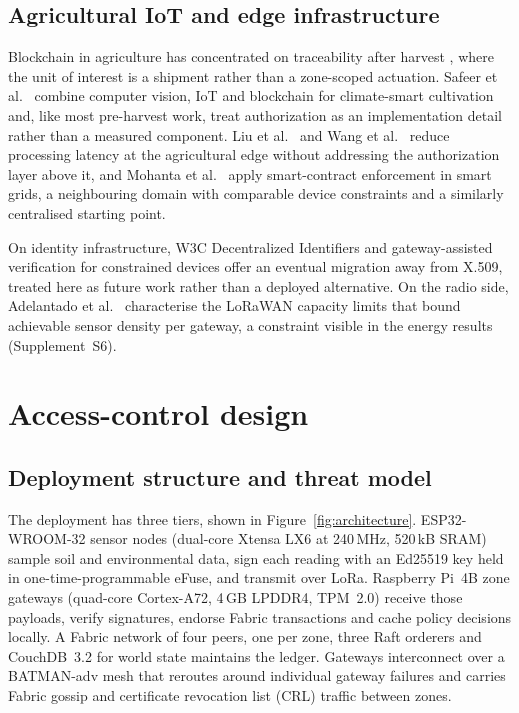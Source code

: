 \documentclass[a4paper,fleqn]{cas-sc}
\begin{document}
\subsection{Agricultural IoT and edge infrastructure}
\label{subsec:rw_agri}

Blockchain in agriculture has concentrated on traceability after harvest
\cite{tian2017traceability,lin2018blockchain,bandara2021modeling}, where the
unit of interest is a shipment rather than a zone-scoped actuation. Safeer et
al.\ \cite{safeer2025agrifarming} combine computer vision, IoT and blockchain
for climate-smart cultivation and, like most pre-harvest work, treat
authorization as an implementation detail rather than a measured component.
Liu et al.\ \cite{liu2019edge} and Wang et al.\ \cite{wang2021edge} reduce
processing latency at the agricultural edge without addressing the
authorization layer above it, and Mohanta et al.\ \cite{mohanta2025smartgrid}
apply smart-contract enforcement in smart grids, a neighbouring domain with
comparable device constraints and a similarly centralised starting point.

On identity infrastructure, W3C Decentralized Identifiers
\cite{w3c_did_core} and gateway-assisted verification for constrained devices
\cite{ferdous2019ssi,tara2023decentralized} offer an eventual migration away
from X.509, treated here as future work rather than a deployed alternative.
On the radio side, Adelantado et al.\ \cite{adelantado2017understanding}
characterise the LoRaWAN capacity limits that bound achievable sensor density
per gateway, a constraint visible in the energy results (Supplement~S6).

\section{Access-control design}
\label{sec:design}

\subsection{Deployment structure and threat model}
\label{subsec:threat}

The deployment has three tiers, shown in Figure~\ref{fig:architecture}.
ESP32-WROOM-32 sensor nodes (dual-core Xtensa LX6 at 240\,MHz, 520\,kB SRAM)
sample soil and environmental data, sign each reading with an Ed25519 key
held in one-time-programmable eFuse, and transmit over LoRa. Raspberry Pi~4B
zone gateways (quad-core Cortex-A72, 4\,GB LPDDR4, TPM~2.0) receive those
payloads, verify signatures, endorse Fabric transactions and cache policy
decisions locally. A Fabric network of four peers, one per zone, three Raft
orderers and CouchDB~3.2 for world state maintains the ledger. Gateways
interconnect over a BATMAN-adv mesh \cite{batman2010} that reroutes around
individual gateway failures and carries Fabric gossip and certificate
revocation list (CRL) traffic between zones.
\end{document}
